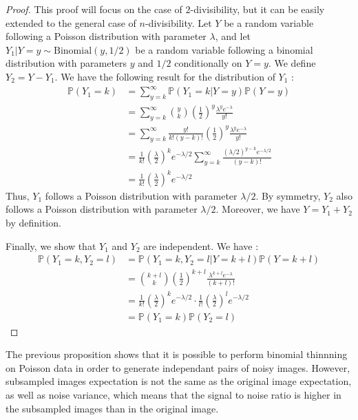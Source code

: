 \begin{proof}
    This proof will focus on the case of $2$-divisibility, but it can be easily extended to the general case of $n$-divisibility.
    Let $Y$ be a random variable following a Poisson distribution with parameter $\lambda$, and let $Y_1 | Y=y \sim \text{Binomial}(y, 1/2)$ be a random variable following a binomial distribution with parameters $y$ and $1/2$ conditionally on $Y=y$. We define $Y_2 = Y - Y_1$. We have the following result for the distribution of $Y_1$ :
    \begin{align*}
        \mathbb{P}(Y_1 = k) &= \sum_{y=k}^{\infty} \mathbb{P}(Y_1 = k | Y = y) \mathbb{P}(Y = y) \\
        &= \sum_{y=k}^{\infty} \binom{y}{k} \left( \frac{1}{2} \right)^y \frac{\lambda^y e^{-\lambda}}{y!} \\
        &= \sum_{y=k}^{\infty} \frac{y!}{k!(y-k)!} \left( \frac{1}{2} \right)^y \frac{\lambda^y e^{-\lambda}}{y!} \\
        &= \frac{1}{k!} \left( \frac{\lambda}{2} \right)^k e^{-\lambda/2} \sum_{y=k}^{\infty} \frac{(\lambda/2)^{y-k} e^{-\lambda/2}}{(y-k)!} \\
        &= \frac{1}{k!} \left( \frac{\lambda}{2} \right)^k e^{-\lambda/2}
    \end{align*}
    Thus, $Y_1$ follows a Poisson distribution with parameter $\lambda/2$. By symmetry, $Y_2$ also follows a Poisson distribution with parameter $\lambda/2$. Moreover, we have $Y = Y_1 + Y_2$ by definition.

    Finally, we show that $Y_1$ and $Y_2$ are independent. We have :
    \begin{align*}
        \mathbb{P}(Y_1 = k, Y_2 = l) &= \mathbb{P}(Y_1 = k, Y_2 = l | Y = k + l) \mathbb{P}(Y = k + l) \\
        &= \binom{k+l}{k} \left( \frac{1}{2} \right)^{k+l} \frac{\lambda^{k+l} e^{-\lambda}}{(k+l)!} \\
        &= \frac{1}{k!} \left( \frac{\lambda}{2} \right)^k e^{-\lambda/2} \cdot \frac{1}{l!} \left( \frac{\lambda}{2} \right)^l e^{-\lambda/2} \\
        &= \mathbb{P}(Y_1 = k) \mathbb{P}(Y_2 = l)
    \end{align*}
\end{proof}

The previous proposition shows that it is possible to perform binomial thinnning on Poisson data in order to generate independant pairs of noisy images.
However, subsampled images expectation is not the same as the original image expectation, as well as noise variance, which means that the signal to noise ratio is higher in the subsampled images than in the original image.

